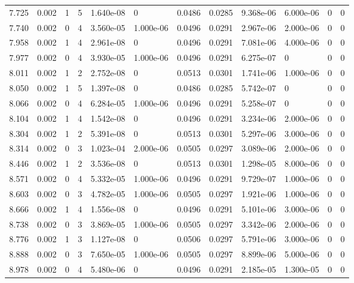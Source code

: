 \documentclass[preview]{standalone}
\begin{document}
{{{\begin{tabular}{L{1.2cm}C{1.2cm} C{0.3cm}C{0.5cm} C{1.4cm}C{1.4cm} C{1.4cm}C{1.4cm} C{1.6cm}C{1.6cm} C{1.6cm}C{1.6cm}}
  7.725  &  0.002  & 1     &  5 &  1.640e-08  & 0  &  0.0486&   0.0285& 9.368e-06 & 6.000e-06   &  0 & 0  \\ 
  7.740  &  0.002  & 0     &  4 &  3.560e-05  & 1.000e-06  &  0.0496&   0.0291& 2.967e-06 & 2.000e-06   &  0 & 0  \\ 
  7.958  &  0.002  & 1     &  4 &  2.961e-08  & 0  &  0.0496&   0.0291& 7.081e-06 & 4.000e-06   &  0 & 0  \\ 
  7.977  &  0.002  & 0     &  4 &  3.930e-05  & 1.000e-06  &  0.0496&   0.0291& 6.275e-07 & 0   &  0 & 0  \\ 
  8.011  &  0.002  & 1     &  2 &  2.752e-08  & 0  &  0.0513&   0.0301& 1.741e-06 & 1.000e-06   &  0 & 0  \\ 
  8.050  &  0.002  & 1     &  5 &  1.397e-08  & 0  &  0.0486&   0.0285& 5.742e-07 & 0   &  0 & 0  \\ 
  8.066  &  0.002  & 0     &  4 &  6.284e-05  & 1.000e-06  &  0.0496&   0.0291& 5.258e-07 & 0   &  0 & 0  \\ 
  8.104  &  0.002  & 1     &  4 &  1.542e-08  & 0  &  0.0496&   0.0291& 3.234e-06 & 2.000e-06   &  0 & 0  \\ 
  8.304  &  0.002  & 1     &  2 &  5.391e-08  & 0  &  0.0513&   0.0301& 5.297e-06 & 3.000e-06   &  0 & 0  \\ 
  8.314  &  0.002  & 0     &  3 &  1.023e-04  & 2.000e-06  &  0.0505&   0.0297& 3.089e-06 & 2.000e-06   &  0 & 0  \\ 
  8.446  &  0.002  & 1     &  2 &  3.536e-08  & 0  &  0.0513&   0.0301& 1.298e-05 & 8.000e-06   &  0 & 0  \\ 
  8.571  &  0.002  & 0     &  4 &  5.332e-05  & 1.000e-06  &  0.0496&   0.0291& 9.729e-07 & 1.000e-06   &  0 & 0  \\ 
  8.603  &  0.002  & 0     &  3 &  4.782e-05  & 1.000e-06  &  0.0505&   0.0297& 1.921e-06 & 1.000e-06   &  0 & 0  \\ 
  8.666  &  0.002  & 1     &  4 &  1.556e-08  & 0  &  0.0496&   0.0291& 5.101e-06 & 3.000e-06   &  0 & 0  \\ 
  8.738  &  0.002  & 0     &  3 &  3.869e-05  & 1.000e-06  &  0.0505&   0.0297& 3.342e-06 & 2.000e-06   &  0 & 0  \\ 
  8.776  &  0.002  & 1     &  3 &  1.127e-08  & 0  &  0.0506&   0.0297& 5.791e-06 & 3.000e-06   &  0 & 0  \\ 
  8.888  &  0.002  & 0     &  3 &  7.650e-05  & 1.000e-06  &  0.0505&   0.0297& 8.899e-06 & 5.000e-06   &  0 & 0  \\ 
  8.978  &  0.002  & 0     &  4 &  5.480e-06  & 0  &  0.0496&   0.0291& 2.185e-05 & 1.300e-05   &  0 & 0  \\ 

\end{tabular}}}}
\end{document}
